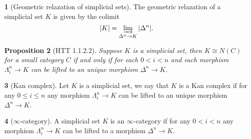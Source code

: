 \documentclass[12pt]{article}
\theoremstyle{definition}
\newtheorem{para}{}[section]
\theoremstyle{plain}
\newtheorem{pro}[para]{Proposition}
\begin{document}
\begin{para}[Geometric relazation of simplicial sets]
    

    The geometric relazation of a simplicial set $K$ is given by the colimit
    \[
        |K| = \varinjlim_{\Delta^n\to K}|\Delta^n|.
    \]
\end{para}

\begin{pro}[HTT 1.1.2.2]
    Suppose $K$ is a simplicial set, then $K\cong N(C)$ for a small category $C$ if and only if for each $0<i<n$ and each morphism $\Lambda_i^n\to K$ can be lifted to an unique morphism $\Delta^n \to K$.
\end{pro}

\begin{para}[Kan complex]
    Let $K$ is a simplicial set, we say that $K$ is a Kan complex if for any $0\leq i\leq n$ any morphism $\Lambda_i^n\to K$ can be lifted to an unique morphism $\Delta^n \to K$.
\end{para}

\begin{para}[$\infty$-category]
    A simplicial set $K$ is an $\infty$-category if for any $0< i< n$ any morphism $\Lambda_i^n\to K$ can be lifted to a morphism $\Delta^n \to K$.
\end{para}
\end{document}
